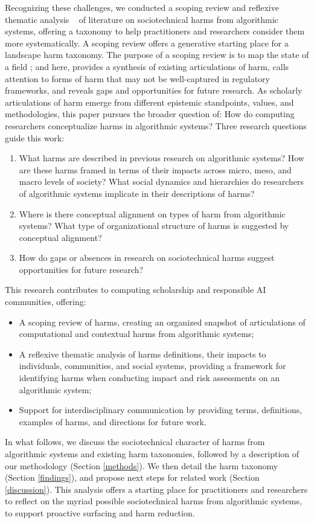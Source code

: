 Recognizing these challenges, we conducted a scoping review \cite{Levac_Colquhoun_OBrien_2010} and reflexive thematic analysis ~\cite{Braun_Clarke_2006} of literature on sociotechnical harms from algorithmic systems, offering a taxonomy to help practitioners and researchers consider them more systematically. A scoping review offers a generative starting place for a landscape harm taxonomy. The purpose of a scoping review is to map the state of a field \cite{arksey2005scoping, Levac_Colquhoun_OBrien_2010}; and here, provides a synthesis of existing articulations of harm, calls attention to forms of harm that may not be well-captured in regulatory frameworks, and reveals gaps and opportunities for future research. As scholarly articulations of harm emerge from different epistemic standpoints, values, and methodologies, this paper pursues the broader question of: How do computing researchers conceptualize harms in algorithmic systems? Three research questions guide this work:
\begin{enumerate}
\label{Research questions}
\item What harms are described in previous research on algorithmic systems? How are these harms framed in terms of their impacts across micro, meso, and macro levels of society? What social dynamics and hierarchies do researchers of algorithmic systems implicate in their descriptions of harms?
\item Where is there conceptual alignment on types of harm from algorithmic systems? What type of organizational structure of harms is suggested by conceptual alignment?
\item How do gaps or absences in research on sociotechnical harms suggest opportunities for future research?
\end{enumerate}

This research contributes to computing scholarship and responsible AI communities, offering:
\begin{itemize}
\item A scoping review of harms, creating an organized snapshot of articulations of computational and contextual harms from algorithmic systems;
\item A reflexive thematic analysis of harms definitions, their impacts to individuals, communities, and social systems, providing a framework for identifying harms when conducting impact and risk assessments on an algorithmic system;
\item Support for interdisciplinary communication by providing terms, definitions, examples of harms, and directions for future work.
\end{itemize}
In what follows, we discuss the sociotechnical character of harms from algorithmic systems and existing harm taxonomies, followed by a description of our methodology (Section \ref{methods}). We then detail the harm taxonomy (Section \ref{findings}), and propose next steps for related work (Section \ref{discussion}). This analysis offers a starting place for practitioners and researchers to reflect on the myriad possible sociotechnical harms from algorithmic systems, to support proactive surfacing and harm reduction.

